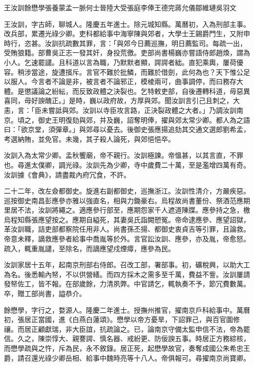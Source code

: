 
\begin{pinyinscope}
王汝訓餘懋學張養蒙孟一脈何士晉陸大受張庭李俸王德完蔣允儀鄒維璉吳羽文

王汝訓，字古師，聊城人。隆慶五年進士。除元城知縣。萬曆初，入為刑部主事。改兵部，累遷光祿少卿。吏科都給事中海寧陳與郊者，大學士王錫爵門生，又附申時行，恣甚。汝訓抗疏數其罪，言：「與郊今日薦巡撫，明日薦監司。每疏一出，受賄狼籍。部曹吳正志一發其奸，身投荒徼。吏部尚書楊巍亦嘗語侍郎趙煥，謂為小人。乞速罷譴。且科道以言為職，乃默默者顯，諤諤者絀。直犯乘輿，屢荷優容。稍涉當途，旋遭擯斥。言官不難於批鱗，而難於借劍，此何為也？天下惟公足以服人。今言者不論是非，被言者不論邪正，模棱兩可，曲事調停，而曰務存大體。是懲議論之紛紜，而反致政體之決裂也。乞特敕吏部，自後遷轉科道，毋惡異喜同，毋好諛醜正。」是時，巍以政府故，方厚與郊。聞汝訓言引己且刺之，大恚，言：「臣未嘗詆與郊。汝訓以寺臣攻言路，正決裂政體之大者。」乃調汝訓南京。頃之，御史王明復劾與郊，并及巍，詔奪明俸，擢與郊太常少卿。都人為之語曰：「欲京堂，須彈章。」與郊尋以憂去。後御史張應揚追劾其交通文選郎劉希孟，考選納賄，並免官。未幾，其子殺人論死，與郊悒悒卒。

汝訓入為太常少卿。孟秋饗廟，帝不親行。汝訓極諫。帝慍甚，以其言直，不罪也。尋進太僕卿，調光祿。汝訓先為少卿，寺中歲費二十萬，至是濫增四萬有奇。汝訓據《會典》，請盡裁內府冗食，不許。

二十二年，改左僉都御史。旋進右副都御史，巡撫浙江。汝訓性清介，方嚴疾惡。巡按御史南昌彭應參亦雅以強直名，相與力鋤豪右。烏程故尚書董份、祭酒范應期里居不法，汝訓將繩之。適應參行部至，應期怨家千人遮道陳牒。應參持之急，檄烏程知縣張應望按之。應期自縊死，其妻吳氏詣闕愬冤。帝命逮應參、應望詔獄，革汝訓職，詰吏部都察院任用非人。尚書孫丕揚、都御史衷貞吉等引罪，且論救。帝意未釋，謫救應參者給事中喬胤等於外。言官訟汝訓、應參，亦及胤，帝愈怒。疏入，輒重胤譴，至除名，而謫應望戍煙瘴，應參為民。

汝訓家居十五年，起南京刑部右侍郎。召改工部，署部事。初，礦稅興，以助大工為名。後悉輸內帑，不以供營繕。而四方採木之需多至千萬，費益不訾。汝訓屢請發帑佐工，皆不報。在部歲餘，力清夙弊。中官請乞，輒執奏不予，節冗費數萬。卒，贈工部尚書，謚恭介。

餘懋學，字行之，婺源人。隆慶二年進士。授撫州推官，擢南京戶科給事中。萬曆初，張居正當國，進《白燕白蓮頌》。懋學以帝方憂旱，下詔罪己，與百官圖修禳。而居正顧獻瑞，非大臣誼，抗疏論之。已，論南京守備太監申信不法，帝為罷信。久之，陳崇惇大、親謇諤、慎名器、戒紛更、防佞諛五事。時居正方務綜核，而懋學疏與之忤，斥為民，永不敘錄。居正死，起懋學故官，奏奪成國公朱希忠王爵，請召還光祿少卿岳相、給事中魏時亮等十八人。帝俱報可。尋擢南京尚寶卿。


\end{pinyinscope}
